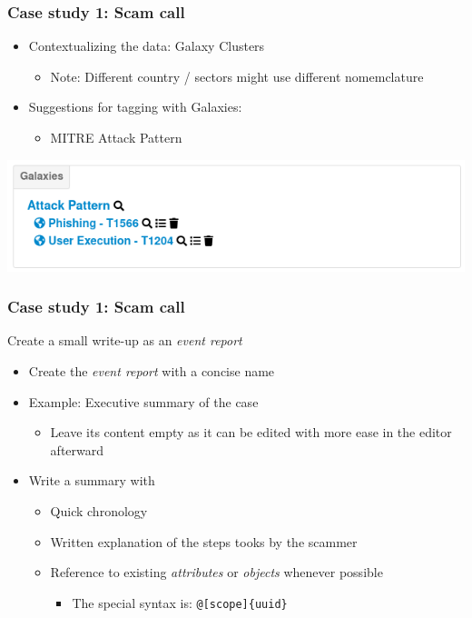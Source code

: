 \begin{frame}
    \frametitle{Case study 1: Scam call}
    \begin{itemize}
        \item Contextualizing the data: Galaxy Clusters
        \begin{itemize}
            \item Note: Different country / sectors might use different nomemclature
        \end{itemize}
        \item Suggestions for tagging with Galaxies:
        \begin{itemize}
            \item MITRE Attack Pattern
        \end{itemize}
    \end{itemize}
    \vspace{1cm}
    \includegraphics[width=1.0\linewidth]{pictures/case1/event-clusters.png}
\end{frame}

\begin{frame}
    \frametitle{Case study 1: Scam call}
    Create a small write-up as an \textit{event report}
    \begin{itemize}
        \item Create the \textit{event report} with a concise name
        \item Example: Executive summary of the case
        \begin{itemize}
            \item Leave its content empty as it can be edited with more ease in the editor afterward
        \end{itemize}
        \item Write a summary with
        \begin{itemize}
            \item Quick chronology
            \item Written explanation of the steps tooks by the scammer
            \item Reference to existing \textit{attributes} or \textit{objects} whenever possible
            \begin{itemize}
                \item The special syntax is: \texttt{@[scope]\{uuid\}}
            \end{itemize}
        \end{itemize}
    \end{itemize}
\end{frame}

